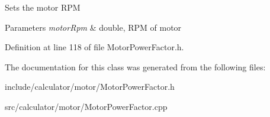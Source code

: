 Sets the motor R\+PM


\begin{DoxyParams}{Parameters}
{\em motor\+Rpm} & double, R\+PM of motor \\
\hline
\end{DoxyParams}


Definition at line 118 of file Motor\+Power\+Factor.\+h.



The documentation for this class was generated from the following files\+:\begin{DoxyCompactItemize}
\item 
include/calculator/motor/Motor\+Power\+Factor.\+h\item 
src/calculator/motor/Motor\+Power\+Factor.\+cpp\end{DoxyCompactItemize}
